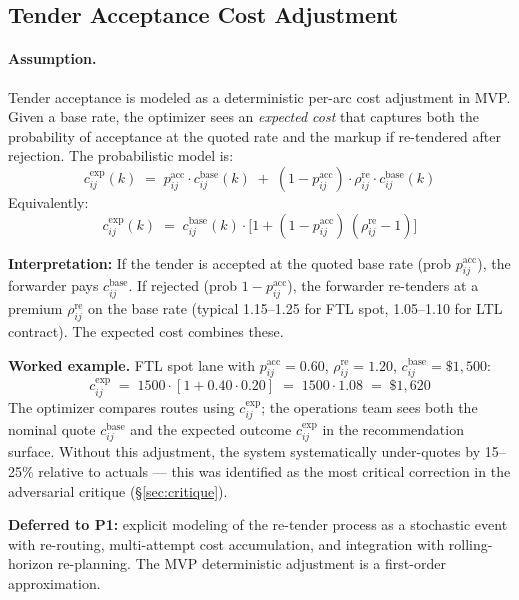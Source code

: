 \documentclass[11pt,a4paper]{article}
\theoremstyle{definition}
\begin{document}
\subsection{Tender Acceptance Cost Adjustment}
\label{sec:tender}

\paragraph{Assumption.}
Tender acceptance is modeled as a deterministic per-arc cost adjustment in MVP. Given a base
rate, the optimizer sees an \emph{expected cost} that captures both the probability of
acceptance at the quoted rate and the markup if re-tendered after rejection. The probabilistic
model is:
\begin{equation}
  c_{ij}^{\text{exp}}(k) \;=\; p_{ij}^{\text{acc}} \cdot c_{ij}^{\text{base}}(k)
                            \;+\; (1 - p_{ij}^{\text{acc}}) \cdot \rho_{ij}^{\text{re}} \cdot c_{ij}^{\text{base}}(k)
  \label{eq:tender-expected}
\end{equation}
Equivalently:
\begin{equation}
  c_{ij}^{\text{exp}}(k) \;=\; c_{ij}^{\text{base}}(k) \cdot \bigl[1 + (1 - p_{ij}^{\text{acc}})\,(\rho_{ij}^{\text{re}} - 1)\bigr]
\end{equation}

\textbf{Interpretation:} If the tender is accepted at the quoted base rate
(prob $p_{ij}^{\text{acc}}$), the forwarder pays $c_{ij}^{\text{base}}$. If rejected
(prob $1 - p_{ij}^{\text{acc}}$), the forwarder re-tenders at a premium
$\rho_{ij}^{\text{re}}$ on the base rate (typical 1.15--1.25 for FTL spot,
1.05--1.10 for LTL contract). The expected cost combines these.

\textbf{Worked example.} FTL spot lane with $p_{ij}^{\text{acc}} = 0.60$,
$\rho_{ij}^{\text{re}} = 1.20$, $c_{ij}^{\text{base}} = \$1{,}500$:
\[
  c_{ij}^{\text{exp}} \;=\; 1500 \cdot [1 + 0.40 \cdot 0.20] \;=\; 1500 \cdot 1.08 \;=\; \$1{,}620
\]
The optimizer compares routes using $c_{ij}^{\text{exp}}$; the operations team sees both the
nominal quote $c_{ij}^{\text{base}}$ and the expected outcome $c_{ij}^{\text{exp}}$ in the
recommendation surface. Without this adjustment, the system systematically under-quotes by
15--25\% relative to actuals --- this was identified as the most critical correction in the
adversarial critique (\S\ref{sec:critique}).

\textbf{Deferred to P1:} explicit modeling of the re-tender process as a stochastic
event with re-routing, multi-attempt cost accumulation, and integration with rolling-horizon
re-planning. The MVP deterministic adjustment is a first-order approximation.
\end{document}
